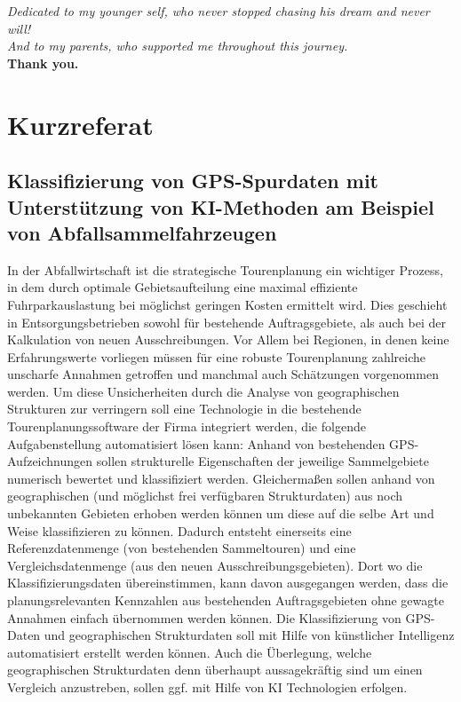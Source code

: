 \documentclass[a4paper,12pt,twoside]{scrreprt}
\begin{document}
\vspace{1cm}
\begin{center}
  \emph{Dedicated to my younger self, who never stopped chasing his dream and
    never will!}\\[0.5cm]
  \emph{And to my parents, who supported me throughout this
    journey.}\\[0.5cm]
  \textbf{Thank you.}
\end{center}
\vspace{1cm}

\newpage
\section*{Kurzreferat}

\subsection*{Klassifizierung von GPS-Spurdaten mit Unterstützung von
  KI-Methoden am Beispiel von Abfallsammelfahrzeugen}

In der Abfallwirtschaft ist die strategische Tourenplanung ein wichtiger
Prozess, in dem durch optimale Gebietsaufteilung eine maximal effiziente
Fuhrparkauslastung bei möglichst geringen Kosten ermittelt wird. Dies geschieht
in Entsorgungsbetrieben sowohl für bestehende Auftragsgebiete, als auch bei der
Kalkulation von neuen Ausschreibungen. Vor Allem bei Regionen, in denen keine
Erfahrungswerte vorliegen müssen für eine robuste Tourenplanung zahlreiche
unscharfe Annahmen getroffen und manchmal auch Schätzungen vorgenommen werden.
Um diese Unsicherheiten durch die Analyse von geographischen Strukturen zur
verringern soll eine Technologie in die bestehende Tourenplanungssoftware der
Firma integriert werden, die folgende Aufgabenstellung automatisiert lösen
kann: Anhand von bestehenden GPS-Aufzeichnungen sollen strukturelle
Eigenschaften der jeweilige Sammelgebiete numerisch bewertet und klassifiziert
werden. Gleichermaßen sollen anhand von geographischen (und möglichst frei
verfügbaren Strukturdaten) aus noch unbekannten Gebieten erhoben werden können
um diese auf die selbe Art und Weise klassifizieren zu können. Dadurch entsteht
einerseits eine Referenzdatenmenge (von bestehenden Sammeltouren) und eine
Vergleichsdatenmenge (aus den neuen Ausschreibungsgebieten). Dort wo die
Klassifizierungsdaten übereinstimmen, kann davon ausgegangen werden, dass die
planungsrelevanten Kennzahlen aus bestehenden Auftragsgebieten ohne gewagte
Annahmen einfach übernommen werden können. Die Klassifizierung von GPS-Daten
und geographischen Strukturdaten soll mit Hilfe von künstlicher Intelligenz
automatisiert erstellt werden können. Auch die Überlegung, welche
geographischen Strukturdaten denn überhaupt aussagekräftig sind um einen
Vergleich anzustreben, sollen ggf. mit Hilfe von KI Technologien erfolgen.
\end{document}
